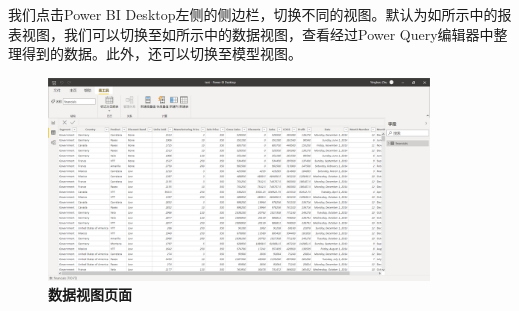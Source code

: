 我们点击Power BI Desktop左侧的侧边栏，切换不同的视图。默认为如所示中的报表视图，我们可以切换至如所示中的数据视图，查看经过Power Query编辑器中整理得到的数据。此外，还可以切换至模型视图。

\begin{figure}[htbp]
    \centering
    \includegraphics[width=0.9\textwidth]{figure/PowerBI/powerbi_data_view.png}
    \caption{\textbf{数据视图页面}}
    \label{fig:powebi_data_view}
\end{figure}